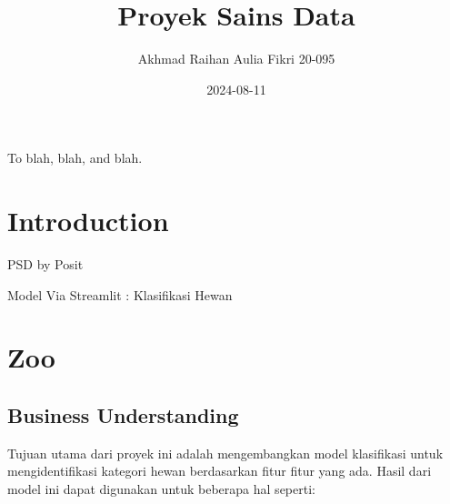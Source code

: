 \documentclass[
  letterpaper,
]{krantz}
\title{Proyek Sains Data}
\author{Akhmad Raihan Aulia Fikri 20-095}
\date{2024-08-11}
\renewcommand*\contentsname{Table of contents}
\newcommand\contentsname{Table of contents}
\begin{document}
\maketitle

\thispagestyle{empty}

\begin{center}
To blah, blah, and blah.
\end{center}

\setlength{\abovedisplayskip}{-5pt}
\setlength{\abovedisplayshortskip}{-5pt}

\ifdefined\Shaded\renewenvironment{Shaded}{\begin{tcolorbox}[boxrule=0pt, enhanced, sharp corners, frame hidden, breakable, interior hidden, borderline west={3pt}{0pt}{shadecolor}]}{\end{tcolorbox}}\fi

\renewcommand*\contentsname{Table of contents}
{
\hypersetup{linkcolor=}
\setcounter{tocdepth}{2}
\tableofcontents
}

\hypertarget{introduction}{%
\chapter*{Introduction}\label{introduction}}


PSD by Posit

Model Via Streamlit : Klasifikasi Hewan \mainmatter


\hypertarget{zoo}{%
\chapter{Zoo}\label{zoo}}

\hypertarget{business-understanding}{%
\section{Business Understanding}\label{business-understanding}}

Tujuan utama dari proyek ini adalah mengembangkan model klasifikasi
untuk mengidentifikasi kategori hewan berdasarkan fitur fitur yang ada.
Hasil dari model ini dapat digunakan untuk beberapa hal seperti:
\end{document}
